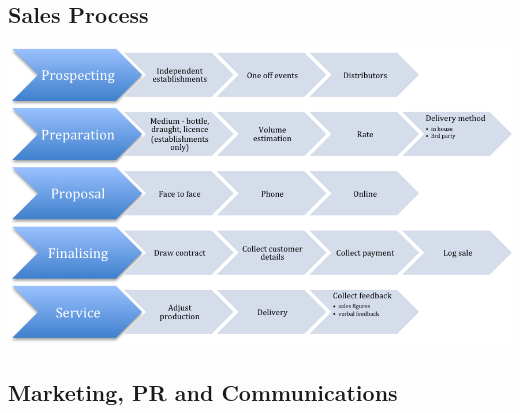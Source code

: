 \documentclass[11pt]{article}
\begin{document}
  \subsection{Sales Process}
  \includegraphics[width=\textwidth,keepaspectratio]{./process.png}
  \subsection{Marketing, PR and Communications}

\end{document}
